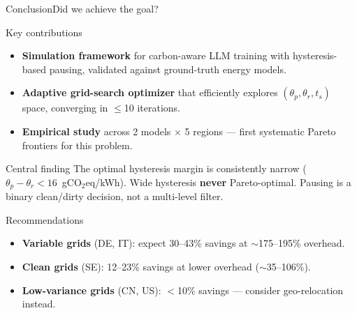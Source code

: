 \begin{frame}[t]{Conclusion}{Did we achieve the goal?}

  \begin{block}{Key contributions}
    \begin{itemize}
      \item \textbf{Simulation framework} for carbon-aware LLM training with
        hysteresis-based pausing, validated against ground-truth energy models.
      \item \textbf{Adaptive grid-search optimizer} that efficiently explores
        $(\theta_p, \theta_r, t_s)$ space, converging in $\leq$10 iterations.
      \item \textbf{Empirical study} across 2 models $\times$ 5 regions
        --- first systematic Pareto frontiers for this problem.
    \end{itemize}
  \end{block}

  \vspace{0.2cm}
  \begin{alertblock}{Central finding}
    The optimal hysteresis margin is consistently narrow
    ($\theta_p - \theta_r < 16$~gCO$_2$eq/kWh).
    Wide hysteresis \textbf{never} Pareto-optimal.
    Pausing is a binary clean/dirty decision, not a multi-level filter.
  \end{alertblock}

  \vspace{0.2cm}
  \begin{block}{Recommendations}
    \begin{itemize}
      \item \textbf{Variable grids} (DE, IT): expect 30--43\% savings at $\sim$175--195\% overhead.
      \item \textbf{Clean grids} (SE): 12--23\% savings at lower overhead ($\sim$35--106\%).
      \item \textbf{Low-variance grids} (CN, US): $<$10\% savings --- consider geo-relocation instead.
    \end{itemize}
  \end{block}

\end{frame}
